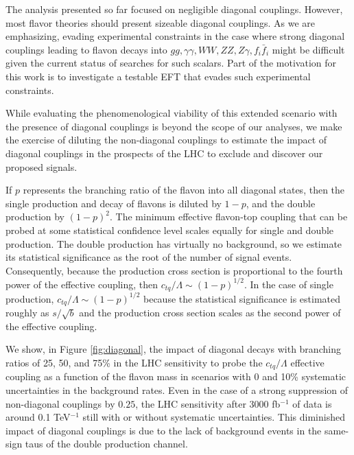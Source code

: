 \documentclass[prd,amsfonts,onecolumn,superscriptaddress,aps,nofootinbib,11pt]{revtex4-1}
\begin{document}
The analysis presented so far focused on negligible diagonal couplings. However, most flavor theories should present sizeable diagonal couplings. As we are emphasizing, evading experimental constraints in the case where strong diagonal couplings leading to flavon decays into $gg,\gamma\gamma,WW,ZZ,Z\gamma,f_i\bar{f}_i$ might be difficult given the current status of searches for such scalars. Part of the motivation for this work is to investigate a testable EFT that evades such experimental constraints.

While evaluating the phenomenological viability of this extended scenario with the presence of diagonal couplings is beyond the scope of our analyses, we make the exercise of diluting the non-diagonal couplings to estimate the impact of diagonal couplings in the prospects of the LHC to exclude and discover our proposed signals. 

If $p$ represents the branching ratio of the flavon into all diagonal states, then the single production and decay of flavons is diluted by $1-p$, and the double production by $(1-p)^2$. The minimum effective flavon-top coupling that can be probed at some statistical confidence level scales equally for single and double production. The double production has virtually no background, so we estimate its statistical significance as the root of the number of signal events. Consequently, because the production cross section is proportional to the fourth power of the effective coupling, then $c_{tq}/\Lambda\sim (1-p)^{1/2}$. In the case of single production, $c_{tq}/\Lambda\sim (1-p)^{1/2}$ because the statistical significance is estimated roughly as $s/\sqrt{b}$ and the production cross section scales as the second power of the effective coupling.

We show, in Figure \ref{fig:diagonal}, the impact of diagonal decays with branching ratios of 25, 50, and 75\% in the LHC sensitivity to probe the $c_{tq}/\Lambda$ effective coupling as a function of the flavon mass in scenarios with 0 and 10\% systematic uncertainties in the background rates. Even in the case of a strong suppression of non-diagonal couplings by $0.25$, the LHC sensitivity after 3000 fb$^{-1}$ of data is around 0.1 TeV$^{-1}$ still with or without systematic uncertainties. This diminished impact of diagonal couplings is due to the lack of background events in the same-sign taus of the double production channel.
\end{document}
